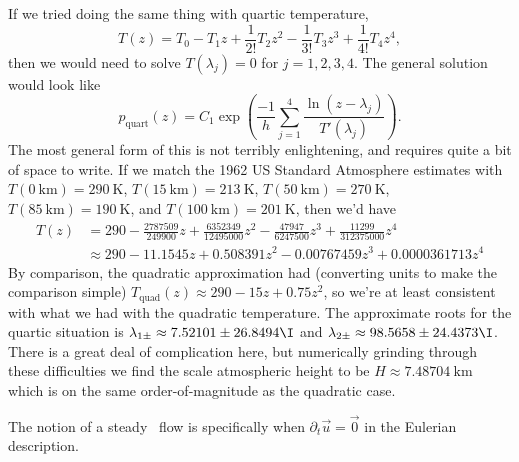 \begin{node}[Hydrostatics]
\begin{node}[Atmosphere]
\begin{node}\label{fluids:euler-flow-000F}%
If we tried doing the same thing with quartic temperature, 
\begin{equation*}
T(z) = T_{0} - T_{1}z + \frac{1}{2!}T_{2}z^{2} - \frac{1}{3!}T_{3}z^{3}
+ \frac{1}{4!}T_{4}z^{4},
\end{equation*}
then we would need to solve $T(\lambda_{j})=0$ for $j=1,2,3,4$. The
general solution would look like
\begin{equation}
p_{\text{quart}}(z) = C_{1}\exp\left(\frac{-1}{h}\sum_{j=1}^{4}\frac{\ln(z-\lambda_{j})}{T'(\lambda_{j})}\right).
\end{equation}
The most general form of this is not terribly enlightening, and requires
quite a bit of space to write. If we match the 1962 US Standard
Atmosphere estimates with $T(\qty{0}{\kilo\meter})=\qty{290}{\kelvin}$,
$T(\qty{15}{\kilo\meter})=\qty{213}{\kelvin}$,
$T(\qty{50}{\kilo\meter})=\qty{270}{\kelvin}$,
$T(\qty{85}{\kilo\meter})=\qty{190}{\kelvin}$,
and $T(\qty{100}{\kilo\meter})=\qty{201}{\kelvin}$, then we'd have
\begin{equation}
\begin{split}
T(z)&=290-\frac{2787509}{249900}z+\frac{6352349}{12495000} z^{2}-\frac{47947}{6247500} z^{3} +\frac{11299}{312375000} z^{4}\\
&\approx 290 - 11.1545 z + 0.508391 z^{2} - 0.00767459 z^{3} + 0.0000361713 z^{4}
\end{split}
\end{equation}
By comparison, the quadratic approximation had (converting units to make
the comparison simple)
$T_{\text{quad}}(z)\approx 290 - 15 z + 0.75z^{2}$, so we're at least
consistent with what we had with the quadratic temperature. The
approximate roots for the quartic situation is
$\lambda_{1\pm}\approx 7.52101\pm26.8494\I$ and
$\lambda_{2\pm}\approx98.5658\pm24.4373\I$. There is a great deal of
complication here, but numerically grinding through these difficulties
we find the scale atmospheric height to be
$H\approx\qty{7.48704}{\kilo\meter}$ which is on the same
order-of-magnitude as the quadratic case.
\end{node} %
\end{node} %

\begin{node}\label{fluids:euler-flow-000D}%
The notion of a steady~ flow is specifically when
$\partial_{t}\vec{u}=\vec{0}$ in the Eulerian description.


\end{node}
\end{node}
